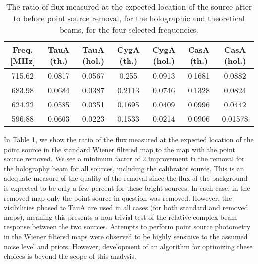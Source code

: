 \begin{table}[ht]
\begin{center}
\begin{tabular}{| c | c | c | c | c | c | c |}
\hline
Freq. [MHz] & TauA (th.) & TauA (hol.) & CygA (th.) & CygA (hol.) & CasA (th.) & CasA (hol.) \\ \hline
715.62  & 0.0817 & 0.0567  & 0.255  & 0.0913 & 0.1681 & 0.0882 \\ \hline
683.98 & 0.0684 & 0.0387 & 0.2113 & 0.0746 & 0.1328 &  0.0824 \\ \hline
624.22 & 0.0585 & 0.0351  & 0.1695 & 0.0409 & 0.0996 & 0.0442 \\ \hline
596.88 & 0.0603 & 0.0223 & 0.1533 & 0.0214 & 0.0906 & 0.01578 \\ \hline
\end{tabular}
\end{center}
\caption{The ratio of flux measured at the expected location of the source after to before point source removal, for the holographic and theoretical beams, for the four selected frequencies. \label{psremove_table}} 
\end{table}

In Table \ref{psremove_table}, we show the ratio of the flux measured at the expected location of the point source in the standard Wiener filtered map to the map with the point source removed. We see a minimum factor of 2 improvement in the removal for the holography beam for all sources, including the calibrator source. This is an adequate measure of the quality of the removal since the flux of the background is expected to be only a few percent for these bright sources. In each case, in the removed map only the point source in question was removed. However, the visibilities phased to TauA are used in all cases (for both standard and removed maps), meaning this presents a non-trivial test of the relative complex beam response between the two sources. Attempts to perform point source photometry in the Wiener filtered maps were observed to be highly sensitive to the assumed noise level and priors. However, development of an algorithm for optimizing these choices is beyond the scope of this analysis.

